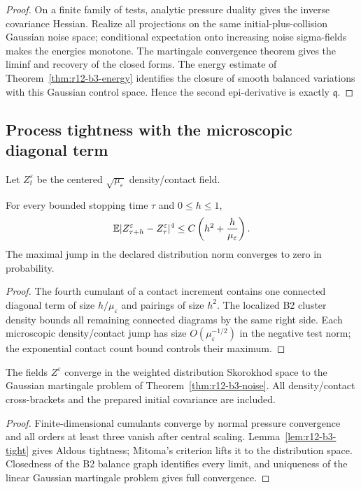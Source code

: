 \begin{proof}
On a finite family of tests, analytic pressure duality gives the inverse
covariance Hessian.  Realize all projections on the same initial-plus-collision
Gaussian noise space; conditional expectation onto increasing noise
sigma-fields makes the energies monotone.  The martingale convergence theorem
gives the liminf and recovery of the closed forms.  The energy estimate of
Theorem~\ref{thm:r12-b3-energy} identifies the closure of smooth balanced
variations with this Gaussian control space.  Hence the second epi-derivative
is exactly $\mathfrak q$.
\end{proof}

\subsection{Process tightness with the microscopic diagonal term}

Let $Z_t^\varepsilon$ be the centered $\sqrt{\mu_\varepsilon}$ density/contact
field.

\begin{lemma}
\label{lem:r12-b3-tight}
For every bounded stopping time $\tau$ and $0\le h\le1$,
\[
 \mathbb E|Z_{\tau+h}^\varepsilon-Z_\tau^\varepsilon|^4
 \le C\left(h^2+{h\over\mu_\varepsilon}\right).
\]
The maximal jump in the declared distribution norm converges to zero in
probability.
\end{lemma}

\begin{proof}
The fourth cumulant of a contact increment contains one connected diagonal
term of size $h/\mu_\varepsilon$ and pairings of size $h^2$.  The localized B2
cluster density bounds all remaining connected diagrams by the same right
side.  Each microscopic density/contact jump has size
$O(\mu_\varepsilon^{-1/2})$ in the negative test norm; the exponential contact
count bound controls their maximum.
\end{proof}

\begin{theorem}
\label{thm:r12-b3-clt}
The fields $Z^\varepsilon$ converge in the weighted distribution Skorokhod
space to the Gaussian martingale problem of
Theorem~\ref{thm:r12-b3-noise}.  All density/contact cross-brackets and the
prepared initial covariance are included.
\end{theorem}

\begin{proof}
Finite-dimensional cumulants converge by normal pressure convergence and all
orders at least three vanish after central scaling.  Lemma~\ref{lem:r12-b3-tight}
gives Aldous tightness; Mitoma's criterion lifts it to the distribution space.
Closedness of the B2 balance graph identifies every limit, and uniqueness of
the linear Gaussian martingale problem gives full convergence.
\end{proof}

